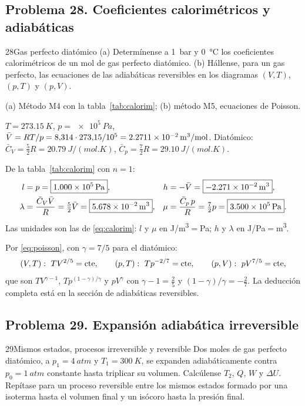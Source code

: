 \subsection{Problema 28. Coeficientes calorimétricos y adiabáticas}
\begin{problema}{28}{Gas perfecto diatómico}
(a) Determínense a \SI{1}{bar} y \SI{0}{\celsius} los coeficientes calorimétricos de un mol de gas perfecto diatómico.
(b) Hállense, para un gas perfecto, las ecuaciones de las adiabáticas reversibles en los diagramas $(V,T)$,
$(p,T)$ y $(p,V)$.
\end{problema}

\begin{resolucion}
\idea (a) Método M4 con la tabla~\ref{tab:calorim}; (b) método M5, ecuaciones de Poisson.

 $T=\SI{273,15}{K}$, $p=\SI{e5}{Pa}$,
$\bar{V}=RT/p=8{,}314\cdot273{,}15/10^{5}=\SI{2,2711e-2}{m^3/mol}$. Diatómico: $\bar C_V=\tfrac52R=\SI{20,79}{J/(mol.K)}$,
$\bar C_p=\tfrac72R=\SI{29,10}{J/(mol.K)}$.

 De la tabla~\ref{tab:calorim} con $n=1$:
\begin{align*}
  l&=p=\boxed{\SI{1,000e5}{Pa}}, &
  h&=-\bar{V}=\boxed{-\SI{2,271e-2}{m^3}},\\
  \lambda&=\frac{\bar C_V\bar{V}}{R}=\tfrac52\bar{V}=\boxed{\SI{5,678e-2}{m^3}}, &
  \mu&=\frac{\bar C_p\,p}{R}=\tfrac72p=\boxed{\SI{3,500e5}{Pa}}.
\end{align*}
Las unidades son las de \eqref{eq:calorim}: $l$ y $\mu$ en \si{J/m^3}$=$\si{Pa}; $h$ y $\lambda$ en \si{J/Pa}$=$\si{m^3}.

 Por \eqref{eq:poisson}, con $\gamma=7/5$ para el diatómico:
\[
  (V,T):\ TV^{2/5}=\cte,\qquad (p,T):\ Tp^{-2/7}=\cte,\qquad (p,V):\ pV^{7/5}=\cte,
\]
que son $TV^{\gamma-1}$, $Tp^{(1-\gamma)/\gamma}$ y $pV^{\gamma}$ con $\gamma-1=\tfrac25$ y $(1-\gamma)/\gamma=-\tfrac27$.
La deducción completa está en la sección de adiabáticas reversibles.
\end{resolucion}

\subsection{Problema 29. Expansión adiabática irreversible}
\begin{problema}{29}{Mismos estados, procesos irreversible y reversible}
Dos moles de gas perfecto diatómico, a $p_1=\SI{4}{atm}$ y $T_1=\SI{300}{K}$, se expanden adiabáticamente contra
$p_0=\SI{1}{atm}$ constante hasta triplicar su volumen. Calcúlense $T_2$, $Q$, $W$ y $\Delta U$. Repítase para un
proceso reversible entre los mismos estados formado por una isoterma hasta el volumen final y un isócoro
hasta la presión final.
\end{problema}

